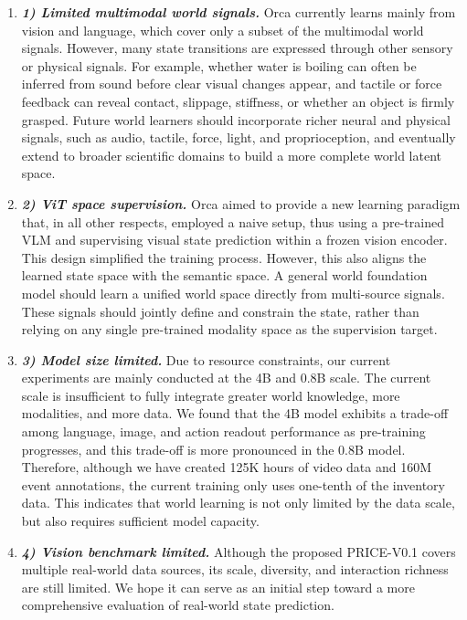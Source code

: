 \vspace{-1ex}
\begin{enumerate}[
    leftmargin=1.35em,
    itemsep=0.35em,
    topsep=0.35em,
    parsep=0em
]


    \item[] \textit{\textbf{1) Limited multimodal world signals.}}
    Orca currently learns mainly from vision and language, which cover only a subset of the multimodal world signals. However, many state transitions are expressed through other sensory or physical signals. For example, whether water is boiling can often be inferred from sound before clear visual changes appear, and tactile or force feedback can reveal contact, slippage, stiffness, or whether an object is firmly grasped. Future world learners should incorporate richer neural and physical signals, such as audio, tactile, force, light, and proprioception, and eventually extend to broader scientific domains to build a more complete world latent space.


    \item[] \textit{\textbf{2) ViT space supervision.}} Orca aimed to provide a new learning paradigm that, in all other respects, employed a naive setup, thus using a pre-trained VLM and supervising visual state prediction within a frozen vision encoder. This design simplified the training process. However, this also aligns the learned state space with the semantic space. A general world foundation model should learn a unified world space directly from multi-source signals. These signals should jointly define and constrain the state, rather than relying on any single pre-trained modality space as the supervision target.

    \item[] \textit{\textbf{3) Model size limited.}} Due to resource constraints, our current experiments are mainly conducted at the 4B and 0.8B scale. The current scale is insufficient to fully integrate greater world knowledge, more modalities, and more data. We found that the 4B model exhibits a trade-off among language, image, and action readout performance as pre-training progresses, and this trade-off is more pronounced in the 0.8B model. Therefore, although we have created 125K hours of video data and 160M event annotations, the current training only uses one-tenth of the inventory data. This indicates that world learning is not only limited by the data scale, but also requires sufficient model capacity.

    
    \item[] \textit{\textbf{4) Vision benchmark limited.}} 
    Although the proposed PRICE-V0.1 covers multiple real-world data sources, its scale, diversity, and interaction richness are still limited. We hope it can serve as an initial step toward a more comprehensive evaluation of real-world state prediction.



\end{enumerate}
